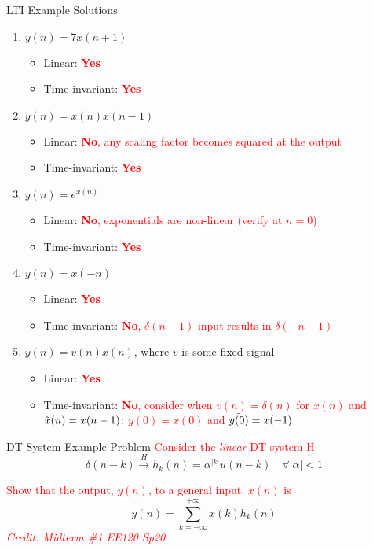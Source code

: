 \begin{frame}{LTI Example Solutions}
    \begin{enumerate}
        \item $y(n) = 7x(n+1)$
        \begin{itemize}
            \item Linear: \textcolor{red}{\textbf{Yes}}
            \item Time-invariant: \textcolor{red}{\textbf{Yes}}
        \end{itemize}
        \item $y(n) = x(n)x(n-1)$
        \begin{itemize}
            \item Linear: \textcolor{red}{\textbf{No}, any scaling factor becomes squared at the output}
            \item Time-invariant: \textcolor{red}{\textbf{Yes}}
        \end{itemize}
        \item $y(n) = e^{x(n)}$
        \begin{itemize}
            \item Linear: \textcolor{red}{\textbf{No}, exponentials are non-linear (verify at $n=0$)}
            \item Time-invariant: \textcolor{red}{\textbf{Yes}}
        \end{itemize}
        \item $y(n) = x(-n)$
        \begin{itemize}
            \item Linear: \textcolor{red}{\textbf{Yes}}
            \item Time-invariant: \textcolor{red}{\textbf{No}, $\delta(n-1)$ input results in $\delta(-n-1)$}
        \end{itemize}
        \item $y(n) = v(n)x(n)$, where $v$ is some fixed signal
        \begin{itemize}
            \item Linear: \textcolor{red}{\textbf{Yes}}
            \item Time-invariant: \textcolor{red}{\textbf{No}, consider when $v(n) = \delta(n)$ for $x(n)$ and $\Tilde{x}(n) = x(n-1)$; $y(0) = x(0)$ and $\Tilde{y(0)} = x(-1)$}
        \end{itemize}
    \end{enumerate}
\end{frame}

\begin{frame}{DT System Example Problem}
    \textcolor{red}{Consider the \textit{linear} DT system H}
    \[
    \delta(n-k) \overset{H}{\longrightarrow} h_k(n) = \alpha^{|k|}u(n-k) \quad \forall |\alpha| < 1
    \]
    
    \vspace{30px}
    
    \textcolor{red}{Show that the output, $y(n)$, to a general input, $x(n)$ is}
    \[
        y(n) = \sum_{k=-\infty}^{+\infty}x(k)h_k(n)
    \]
    {\footnotesize\textcolor{red}{\textit{Credit: Midterm \#1 EE120 Sp20}}}
    
\end{frame}

